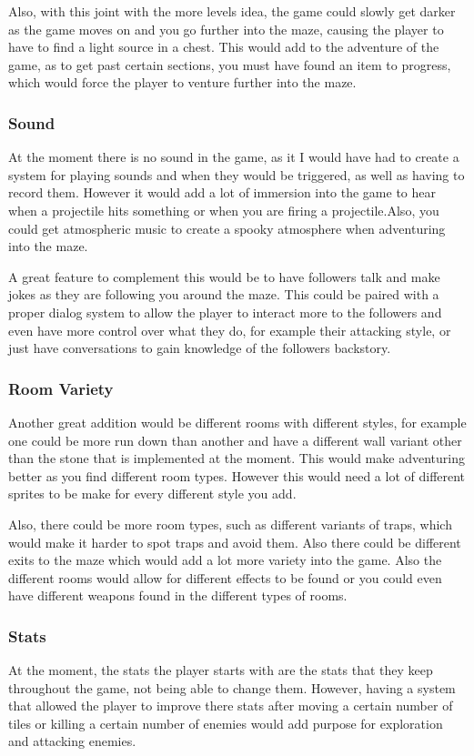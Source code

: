 \documentclass[../Main.tex]{subfiles}
\begin{document}
            Also, with this joint with the more levels idea, the game could slowly get darker as the game moves on and you go further into the maze, causing the player to have to find a light source in a chest. This would add to the adventure of the game, as to get past certain sections, you must have found an item to progress, which would force the player to venture further into the maze.

        \subsubsection{Sound}
            At the moment there is no sound in the game, as it I would have had to create a system for playing sounds and when they would be triggered, as well as having to record them. However it would add a lot of immersion into the game to hear when a projectile hits something or when you are firing a projectile.Also, you could get atmospheric music to create a spooky atmosphere when adventuring into the maze.

            A great feature to complement this would be to have followers talk and make jokes as they are following you around the maze. This could be paired with a proper dialog system to allow the player to interact more to the followers and even have more control over what they do, for example their attacking style, or just have conversations to gain knowledge of the followers backstory.

        \subsubsection{Room Variety}
            Another great addition would be different rooms with different styles, for example one could be more run down than another and have a different wall variant other than the stone that is implemented at the moment. This would make adventuring better as you find different room types. However this would need a lot of different sprites to be make for every different style you add.

            Also, there could be more room types, such as different variants of traps, which would make it harder to spot traps and avoid them. Also there could be different exits to the maze which would add a lot more variety into the game. Also the different rooms would allow for different effects to be found or you could even have different weapons found in the different types of rooms.

        \subsubsection{Stats}
            At the moment, the stats the player starts with are the stats that they keep throughout the game, not being able to change them. However, having a system that allowed the player to improve there stats after moving a certain number of tiles or killing a certain number of enemies would add purpose for exploration and attacking enemies.
\end{document}
